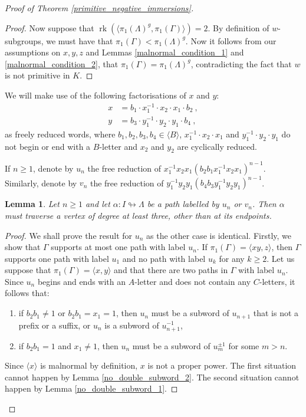 \documentclass[11pt, a4paper]{amsart}
\newtheorem{lemma}[theorem]{Lemma}
\theoremstyle{definition}
\def\immerses{\looparrowright}
\DeclareMathOperator{\rk}{rk}
\begin{document}
\begin{proof}[Proof of Theorem \ref{primitive_negative_immersions}]
\begin{proof}
Now suppose that $\rk(\langle \pi_1(\Lambda)^g,\pi_1(\Gamma)\rangle) = 2$. By definition of $w$-subgroups, we must have that $\pi_1(\Gamma)<\pi_1(\Lambda)^g$.  Now it follows from our assumptions on $x, y, z$ and Lemmas \ref{malnormal_condition_1} and \ref{malnormal_condition_2}, that $\pi_1(\Gamma) = \pi_1(\Lambda)^g$, contradicting the fact that $w$ is not primitive in $K$.
\end{proof}


We will make use of the following factorisations of $x$ and $y$:
\begin{align*}
x &= b_1\cdot x_1^{-1}\cdot x_2\cdot x_1\cdot b_2~,\\
y &= b_3\cdot y_1^{-1}\cdot y_2\cdot y_1\cdot b_4~,
\end{align*}
as freely reduced words, where $b_1, b_2, b_3, b_4\in \langle B\rangle$, $x_1^{-1}\cdot x_2\cdot x_1$ and $y_1^{-1}\cdot y_2\cdot y_1$ do not begin or end with a $B$-letter and $x_2$ and $y_2$ are cyclically reduced. 

If $n\geq1$, denote by $u_n$ the free reduction of $x_1^{-1}x_2x_1(b_2b_1x_1^{-1}x_2x_1)^{n-1}$. Similarly, denote by $v_n$ the free reduction of $y_1^{-1}y_2y_1(b_4b_3y_1^{-1}y_2y_1)^{n-1}$.

\begin{lemma}
\label{crossing_vertices}
Let $n\geq 1$ and let $\alpha:I\immerses \Lambda$ be a path labelled by $u_n$ or $v_n$. Then $\alpha$ must traverse a vertex of degree at least three, other than at its endpoints.
\end{lemma}

\begin{proof}
We shall prove the result for $u_n$ as the other case is identical. Firstly, we show that $\Gamma$ supports at most one path with label $u_n$. If $\pi_1(\Gamma) = \langle xy, z\rangle$, then $\Gamma$ supports one path with label $u_1$ and no path with label $u_k$ for any $k\geq 2$. Let us suppose that $\pi_1(\Gamma) = \langle x, y\rangle$ and that there are two paths in $\Gamma$ with label $u_n$. Since $u_n$ begins and ends with an $A$-letter and does not contain any $C$-letters, it follows that:
\begin{enumerate}
\item if $b_2b_1\neq 1$ or $b_2b_1 = x_1 = 1$, then $u_n$ must be a subword of $u_{n+1}$ that is not a prefix or a suffix, or $u_n$ is a subword of $u_{n+1}^{-1}$,
\item if $b_2b_1 = 1$ and $x_1 \neq 1$, then $u_n$ must be a subword of $u_{m}^{\pm1}$ for some $m>n$.
\end{enumerate}
Since $\langle x\rangle$ is malnormal by definition, $x$ is not a proper power. The first situation cannot happen by Lemma \ref{no_double_subword_2}. The second situation cannot happen by Lemma \ref{no_double_subword_1}.


\end{proof}
\end{proof}
\end{document}
